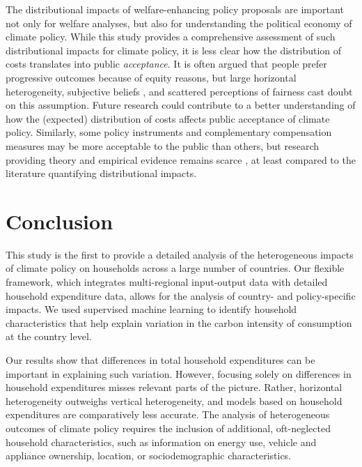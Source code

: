 \documentclass[12pt, a4paper]{article}
\begin{document}
The distributional impacts of welfare-enhancing policy proposals are important not only for welfare analyses, but also for understanding the political economy of climate policy. While this study provides a comprehensive assessment of such distributional impacts for climate policy, it is less clear how the distribution of costs translates into public \textit{acceptance}. It is often argued that people prefer progressive outcomes because of equity reasons, but large horizontal heterogeneity, subjective beliefs \autocite{Douenne.2020}, and scattered perceptions of fairness \autocite{MaestreAndres.2019,Povitkina.2021} cast doubt on this assumption. Future research could contribute to a better understanding of how the (expected) distribution of costs affects public acceptance of climate policy. Similarly, some policy instruments and complementary compensation measures may be more acceptable to the public than others, but research providing theory and empirical evidence remains scarce \autocite[e.g.,][]{Sommer.2022,Valencia.2023}, at least compared to the literature quantifying distributional impacts. 

\section{Conclusion} \label{sec:conclusion}

This study is the first to provide a detailed analysis of the heterogeneous impacts of climate policy on households across a large number of countries. Our flexible framework, which integrates multi-regional input-output data with detailed household expenditure data, allows for the analysis of country- and policy-specific impacts. We used supervised machine learning to identify household characteristics that help explain variation in the carbon intensity of consumption at the country level.

Our results show that differences in total household expenditures can be important in explaining such variation. However, focusing solely on differences in household expenditures misses relevant parts of the picture. Rather, horizontal heterogeneity outweighs vertical heterogeneity, and models based on household expenditures are comparatively less accurate. The analysis of heterogeneous outcomes of climate policy requires the inclusion of additional, oft-neglected household characteristics, such as information on energy use, vehicle and appliance ownership, location, or sociodemographic characteristics.
\end{document}

